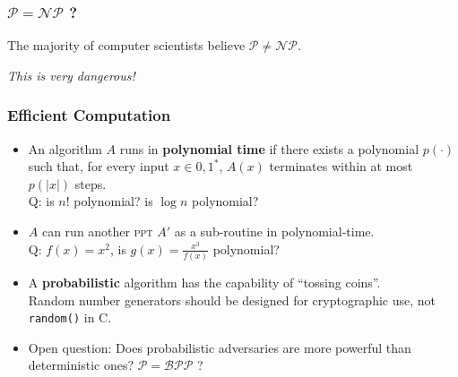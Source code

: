 \begin{frame}\frametitle{$\mathcal{P} = \mathcal{NP}$ ?}
\begin{figure}
\begin{center}

\end{center}
\end{figure}
\centerline{The majority of computer scientists believe $\mathcal{P} \ne \mathcal{NP}$.}
\centerline{\alert{\emph{This is very dangerous!}}} 
\end{frame}
\begin{frame}[fragile]\frametitle{Efficient Computation}
\begin{itemize}
\item An algorithm $A$ runs in \textbf{polynomial time} if there exists a polynomial $p(\cdot)$ such that,
 for every input $x \in {0,1}^*$, $A(x)$ terminates within at most $p(|x|)$ steps. \\
 \alert{Q: is $n!$ polynomial? is $\log n$ polynomial?}
\item $A$ can run another \textsc{ppt} $A'$ as a sub-routine in polynomial-time.\\
 \alert{Q: $f(x) = x^{2} $, is $g(x) =  \frac{x^{3}}{f(x)}$ polynomial?}
\item A \textbf{probabilistic} algorithm has the capability of ``tossing coins''.\\
Random number generators should be designed for cryptographic use, not \verb|random()| in C. 
\item \alert{Open question}: Does probabilistic adversaries are more powerful than deterministic ones?  
$\mathcal{P} = \mathcal{BPP}$ ? 
\end{itemize}
\end{frame}
